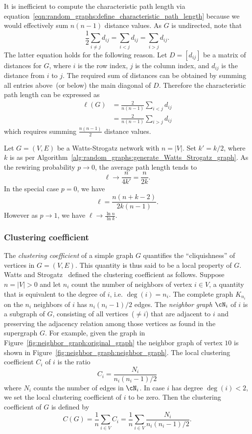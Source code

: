 It is inefficient to compute the characteristic path length via
equation~\eqref{eqn:random_graphs:define_characteristic_path_length}
because we would effectively sum $n(n - 1)$ distance values. As $G$ is
undirected, note that
\[
\frac{1}{2} \sum_{i \neq j} d_{ij}
=
\sum_{i < j} d_{ij}
=
\sum_{i > j} d_{ij}.
\]
The latter equation holds for the following reason. Let $D = [d_{ij}]$
be a matrix of distances for $G$, where $i$ is the row index, $j$ is
the column index, and $d_{ij}$ is the distance from $i$ to $j$. The
required sum of distances can be obtained by summing all entries
above~(or below) the main diagonal of $D$. Therefore the
characteristic path length can be expressed as
\begin{align*}
\ell(G)
&=
\frac{2}{n(n-1)} \sum_{i < j} d_{ij} \\[4pt]
&=
\frac{2}{n(n-1)} \sum_{i > j} d_{ij}
\end{align*}
which requires summing $\frac{n(n-1)}{2}$ distance values.

Let $G = (V,E)$ be a Watts-Strogatz network with $n = |V|$. Set
$k' = k/2$, where $k$ is as per
Algorithm~\ref{alg:random_graphs:generate_Watts_Strogatz_graph}. As
the rewiring probability $p \to 0$, the average path length tends to
\[
\ell
\to
\frac{n}{4k'}
=
\frac{n}{2k}.
\]
In the special case $p = 0$, we have
\[
\ell
=
\frac{n (n + k - 2)} {2k (n - 1)}.
\]
However as $p \to 1$, we have $\ell \to \frac{\ln n} {\ln k}$.



\subsubsection{Clustering coefficient}

The \emph{clustering coefficient} of a
simple graph $G$ quantifies the ``cliquishness'' of vertices in
$G = (V,E)$. This quantity is thus said to be a local property of
$G$. Watts and Strogatz~\cite{WattsStrogatz1998} defined the
clustering coefficient as follows. Suppose $n = |V| > 0$ and let $n_i$
count the number of neighbors of vertex $i \in V$, a quantity that is
equivalent to the degree of $i$, i.e. $\deg(i) = n_i$. The complete
graph $K_{n_i}$ on the $n_i$ neighbors of $i$ has $n_i(n_i - 1) / 2$
edges. The \emph{neighbor graph}
$\cN_i$ of $i$ is a subgraph of $G$, consisting of all
vertices~($\neq i$) that are adjacent to $i$ and preserving the
adjacency relation among those vertices as found in the supergraph
$G$. For example, given the graph in
Figure~\ref{fig:neighbor_graph:original_graph} the neighbor graph of
vertex $10$ is shown in
Figure~\ref{fig:neighbor_graph:neighbor_graph}. The local clustering
coefficient $C_i$ of $i$ is the ratio
\[
C_i
=
\frac{N_i} {n_i (n_i - 1) / 2}
\]
where $N_i$ counts the number of edges in $\cN_i$. In case $i$ has
degree $\deg(i) < 2$, we set the local clustering coefficient of $i$
to be zero. Then the clustering
coefficient of $G$ is defined by
\[
C(G)
=
\frac{1}{n} \sum_{i \in V} C_i
=
\frac{1}{n} \sum_{i \in V} \frac{N_i} {n_i (n_i - 1) / 2}.
\]

